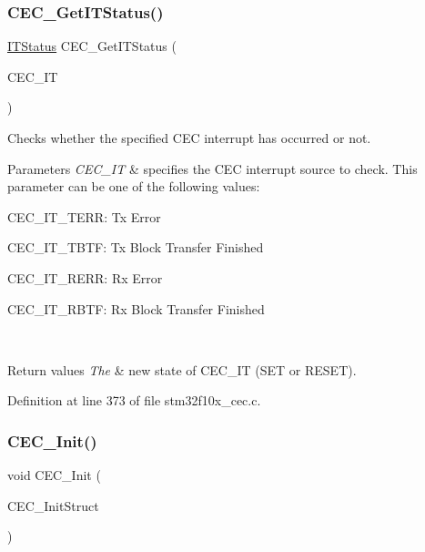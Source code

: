 \subsubsection{\texorpdfstring{C\+E\+C\+\_\+\+Get\+I\+T\+Status()}{CEC\_GetITStatus()}}
{\footnotesize\ttfamily \hyperlink{group___exported__types_gaacbd7ed539db0aacd973a0f6eca34074}{I\+T\+Status} C\+E\+C\+\_\+\+Get\+I\+T\+Status (\begin{DoxyParamCaption}\item[{uint8\+\_\+t}]{C\+E\+C\+\_\+\+IT }\end{DoxyParamCaption})}



Checks whether the specified C\+EC interrupt has occurred or not. 


\begin{DoxyParams}{Parameters}
{\em C\+E\+C\+\_\+\+IT} & specifies the C\+EC interrupt source to check. This parameter can be one of the following values\+: \begin{DoxyItemize}
\item C\+E\+C\+\_\+\+I\+T\+\_\+\+T\+E\+RR\+: Tx Error \item C\+E\+C\+\_\+\+I\+T\+\_\+\+T\+B\+TF\+: Tx Block Transfer Finished \item C\+E\+C\+\_\+\+I\+T\+\_\+\+R\+E\+RR\+: Rx Error \item C\+E\+C\+\_\+\+I\+T\+\_\+\+R\+B\+TF\+: Rx Block Transfer Finished \end{DoxyItemize}
\\
\hline
\end{DoxyParams}

\begin{DoxyRetVals}{Return values}
{\em The} & new state of C\+E\+C\+\_\+\+IT (S\+ET or R\+E\+S\+ET). \\
\hline
\end{DoxyRetVals}


Definition at line 373 of file stm32f10x\+\_\+cec.\+c.

\mbox{\label{group___c_e_c___exported___functions_gaf48aee745a16370372b3eaa7cf3ed22b}} 
\subsubsection{\texorpdfstring{C\+E\+C\+\_\+\+Init()}{CEC\_Init()}}
{\footnotesize\ttfamily void C\+E\+C\+\_\+\+Init (\begin{DoxyParamCaption}\item[{\hyperlink{struct_c_e_c___init_type_def}{C\+E\+C\+\_\+\+Init\+Type\+Def} $\ast$}]{C\+E\+C\+\_\+\+Init\+Struct }\end{DoxyParamCaption})}



